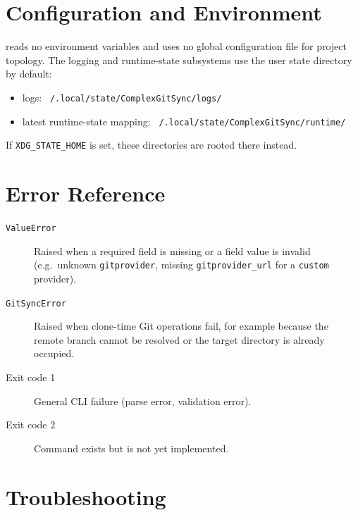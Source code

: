\section{Configuration and Environment}

\cgspkg{} reads no environment variables and uses no global configuration
file for project topology. The logging and runtime-state subsystems use the
user state directory by default:

\begin{itemize}
  \item logs: \texttt{~/.local/state/ComplexGitSync/logs/}
  \item latest runtime-state mapping:
        \texttt{~/.local/state/ComplexGitSync/runtime/}
\end{itemize}

If \texttt{XDG\_STATE\_HOME} is set, these directories are rooted there
instead.

\section{Error Reference}

\begin{description}
  \item[\texttt{ValueError}] Raised when a required field is missing or a
    field value is invalid (e.g.\ unknown \texttt{gitprovider},
    missing \texttt{gitprovider\_url} for a \texttt{custom} provider).
  \item[\texttt{GitSyncError}] Raised when clone-time Git operations fail,
    for example because the remote branch cannot be resolved or the target
    directory is already occupied.
  \item[Exit code 1] General CLI failure (parse error, validation error).
  \item[Exit code 2] Command exists but is not yet implemented.
\end{description}

\section{Troubleshooting}

